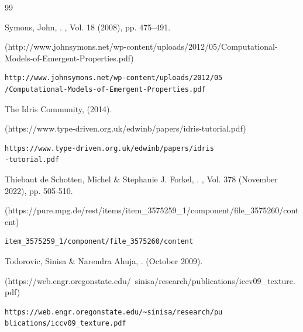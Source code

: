 \begin{thebibliography}{99}
{\begin{bItem}[JohnSymons]
Symons, John,
.
, 
Vol. 18 (2008), pp. 475--491.
%
\begin{boxurl}(http://www.johnsymons.net/wp-content/uploads/2012/05/Computational-Models-of-Emergent-Properties.pdf)
\begin{lstlisting}
http://www.johnsymons.net/wp-content/uploads/2012/05
/Computational-Models-of-Emergent-Properties.pdf
\end{lstlisting}
\end{boxurl}\end{bItem}





\begin{bItem}[Idris]
The Idris Community, 
  (2014).
%
\begin{boxurl}(https://www.type-driven.org.uk/edwinb/papers/idris-tutorial.pdf)
\begin{lstlisting}
https://www.type-driven.org.uk/edwinb/papers/idris
-tutorial.pdf
\end{lstlisting}
\end{boxurl}\end{bItem}



\begin{bItem}[SchottenForkel]
Thiebaut de Schotten, Michel \& Stephanie J. Forkel,  
.
, 
Vol. 378 (November 2022), pp. 505-510. 
%
\begin{boxurl}(https://pure.mpg.de/rest/items/item_3575259_1/component/file_3575260/content)
\begin{lstlisting}
item_3575259_1/component/file_3575260/content
\end{lstlisting}
\end{boxurl}\end{bItem}




\begin{bItem}[TodorovicAhuja]
Todorovic, Sinisa \& Narendra Ahuja,  
.
(October 2009).
%
\begin{boxurl}(https://web.engr.oregonstate.edu/~sinisa/research/publications/iccv09_texture.pdf)
\begin{lstlisting}
https://web.engr.oregonstate.edu/~sinisa/research/pu
blications/iccv09_texture.pdf
\end{lstlisting}
\end{boxurl}\end{bItem}


}
\end{thebibliography}
